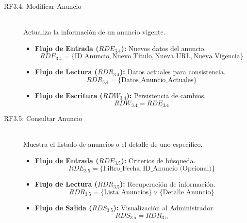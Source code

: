 \begin{description}
    \item[RF3.4: Modificar Anuncio] \hfill \\
    Actualiza la información de un anuncio vigente.
    \begin{itemize}
        \item \textbf{Flujo de Entrada ($RDE_{3.4}$):} Nuevos datos del anuncio.
        \[ RDE_{3.4} = \{ \text{ID\_Anuncio}, \text{Nuevo\_Título}, \text{Nueva\_URL}, \text{Nueva\_Vigencia} \} \]
        \item \textbf{Flujo de Lectura ($RDR_{3.4}$):} Datos actuales para consistencia.
        \[ RDR_{3.4} = \{ \text{Datos\_Anuncio\_Actuales} \} \]
        \item \textbf{Flujo de Escritura ($RDW_{3.4}$):} Persistencia de cambios.
        \[ RDW_{3.4} = RDE_{3.4} \]
    \end{itemize}

    \item[RF3.5: Consultar Anuncio] \hfill \\
    Muestra el listado de anuncios o el detalle de uno específico.
    \begin{itemize}
        \item \textbf{Flujo de Entrada ($RDE_{3.5}$):} Criterios de búsqueda.
        \[ RDE_{3.5} = \{ \text{Filtro\_Fecha}, \text{ID\_Anuncio (Opcional)} \} \]
        \item \textbf{Flujo de Lectura ($RDR_{3.5}$):} Recuperación de información.
        \[ RDR_{3.5} = \{ \text{Lista\_Anuncios} \} \lor \{ \text{Detalle\_Anuncio} \} \]
        \item \textbf{Flujo de Salida ($RDS_{3.5}$):} Visualización al Administrador.
        \[ RDS_{3.5} = RDR_{3.5} \]
    \end{itemize}
\end{description}

